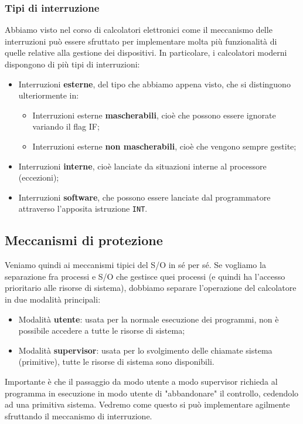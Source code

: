 \documentclass[a4paper,11pt]{article}
\begin{document}
\subsubsection{Tipi di interruzione}
Abbiamo visto nel corso di calcolatori elettronici come il meccanismo delle interruzioni può essere sfruttato per implementare molta più funzionalità di quelle relative alla gestione dei dispositivi.
In particolare, i calcolatori moderni dispongono di più tipi di interruzioni:
\begin{itemize}
	\item Interruzioni \textbf{esterne}, del tipo che abbiamo appena visto, che si distinguono ulteriormente in:
		\begin{itemize}
			\item Interruzioni esterne \textbf{mascherabili}, cioè che possono essere ignorate variando il flag IF;
			\item Interruzioni esterne \textbf{non mascherabili}, cioè che vengono sempre gestite;
		\end{itemize}
	\item Interruzioni \textbf{interne}, cioè lanciate da situazioni interne al processore (eccezioni);
	\item Interruzioni \textbf{software}, che possono essere lanciate dal programmatore attraverso l'apposita istruzione \lstinline|INT|.
\end{itemize}

\subsection{Meccanismi di protezione}
Veniamo quindi ai meccanismi tipici del S/O in sé per sé.
Se vogliamo la separazione fra processi e S/O che gestisce quei processi (e quindi ha l'accesso prioritario alle risorse di sistema), dobbiamo separare l'operazione del calcolatore in due modalità principali:
\begin{itemize}
	\item Modalità \textbf{utente}: usata per la normale esecuzione dei programmi, non è possibile accedere a tutte le risorse di sistema;
	\item Modalità \textbf{supervisor}: usata per lo svolgimento delle chiamate sistema (primitive), tutte le risorse di sistema sono disponibili.
\end{itemize}

Importante è che il passaggio da modo utente a modo supervisor richieda al programma in esecuzione in modo utente di "abbandonare" il controllo, cedendolo ad una primitiva sistema.
Vedremo come questo si può implementare agilmente sfruttando il meccanismo di interruzione.
\end{document}
